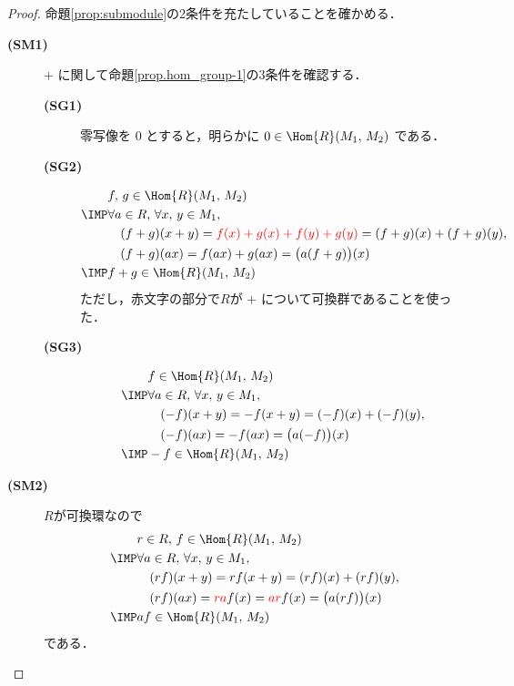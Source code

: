 \documentclass[geometry_main]{subfiles}
\begin{document}
\begin{proof}
	命題\ref{prop:submodule}の2条件を充たしていることを確かめる．
	\begin{description}
		\item[\textbf{(SM1)}] $+$ に関して命題\ref{prop.hom_group-1}の3条件を確認する．
		\begin{description}
			\item[\textbf{(SG1)}] 零写像を $0$ とすると，明らかに $0 \in \Hom{R} (M_1,\, M_2)$ である．
			\item[\textbf{(SG2)}] 
			\begin{align}
				&f,\, g \in \Hom{R} (M_1,\, M_2) \\
				\IMP &\forall a \in R,\, \forall x,\, y \in M_1,\\ 
				&\quad (f+g)(x+y) =\textcolor{red}{f(x) +g(x) + f(y) + g(y)} = (f+g)(x) + (f+g)(y), \\
				&\quad (f+g)(ax) = f(ax) + g(ax) = \bigl(a(f+g)\bigr)(x) \\
				\IMP &f+g \in \Hom{R} (M_1,\, M_2)
			\end{align}
			ただし，赤文字の部分で$R$が $+$ について可換群であることを使った．
			\item[\textbf{(SG3)}] 
			\begin{align}
				&f \in \Hom{R} (M_1,\, M_2) \\
				\IMP &\forall a \in R,\, \forall x,\, y \in M_1,\\
				&\quad (-f)(x+y) = -f(x+y) = (-f)(x) + (-f)(y), \\
				&\quad (-f)(ax) = -f(ax) = \bigl( a(-f) \bigr)(x) \\
				\IMP &-f \in \Hom{R} (M_1,\, M_2)
			\end{align}
		\end{description}
		\item[\textbf{(SM2)}] $R$が可換環なので
		\begin{align}
			&r \in R,\, f \in \Hom{R} (M_1,\, M_2) \\
			\IMP &\forall a \in R,\, \forall x,\, y \in M_1,\\
			&\quad (rf)(x+y) = rf(x+y) = (rf)(x) + (rf)(y), \\
			&\quad (rf)(ax) = \textcolor{red}{ra} f(x) = \textcolor{red}{ar} f(x) = \bigl( a(rf) \bigr)(x) \\
			\IMP &af \in \Hom{R} (M_1,\, M_2)
		\end{align}
		である．
	\end{description}
\end{proof}
\end{document}
